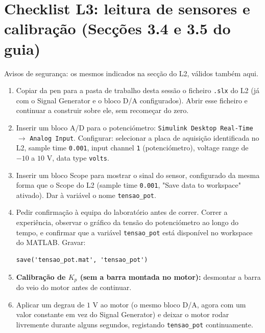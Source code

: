 \documentclass[a4paper,11pt]{article}
\begin{document}
\section*{Checklist L3: leitura de sensores e calibração (Secções 3.4 e 3.5 do guia)}

Avisos de segurança: os mesmos indicados na secção do L2, válidos também aqui.

\begin{enumerate}[label=$\square$, leftmargin=1.5em]
  \item Copiar da pen para a pasta de trabalho desta sessão o ficheiro \texttt{.slx}
  do L2 (já com o Signal Generator e o bloco D/A configurados). Abrir esse ficheiro
  e continuar a construir sobre ele, sem recomeçar do zero.

  \item Inserir um bloco A/D para o potenciómetro: \texttt{Simulink Desktop
  Real-Time} $\to$ \texttt{Analog Input}. Configurar: selecionar a placa de
  aquisição identificada no L2, sample time \texttt{0.001}, input channel
  \texttt{1} (potenciómetro), voltage range de $-10$ a $10$ V, data type
  \texttt{volts}.

  \item Inserir um bloco Scope para mostrar o sinal do sensor, configurado da mesma
  forma que o Scope do L2 (sample time \texttt{0.001}, "Save data to workspace"
  ativado). Dar à variável o nome \texttt{tensao\_pot}.

  \item Pedir confirmação à equipa do laboratório antes de correr. Correr a
  experiência, observar o gráfico da tensão do potenciómetro ao longo do tempo, e
  confirmar que a variável \texttt{tensao\_pot} está disponível no workspace do
  MATLAB. Gravar:
  \begin{verbatim}
save('tensao_pot.mat', 'tensao_pot')
  \end{verbatim}

  \item \textbf{Calibração de $K_p$ (sem a barra montada no motor):} desmontar a
  barra do veio do motor antes de continuar.

  \item Aplicar um degrau de $1$ V ao motor (o mesmo bloco D/A, agora com um valor
  constante em vez do Signal Generator) e deixar o motor rodar livremente durante
  alguns segundos, registando \texttt{tensao\_pot} continuamente.


\end{enumerate}
\end{document}
